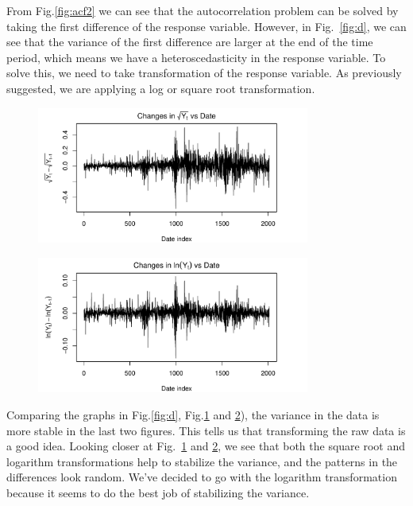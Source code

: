 \documentclass[conference,onecolumn,11pt]{IEEEtran}
\begin{document}
From Fig.\ref{fig:acf2} we can see that the autocorrelation problem can be solved by taking the first difference of the response variable. However, in Fig.~\ref{fig:d}, we can see that the variance of the first difference are larger at the end of the time period, which means we have a heteroscedasticity in the response variable. To solve this, we need to take transformation of the response variable. As previously suggested, we are applying a log or square root transformation.


\begin{figure}[htpb]
	\centering
	\includegraphics[width=0.8\textwidth]{pic/Sqrt_AdjClosed.pdf}
	\caption{}
	\label{fig:dsqrt}
\end{figure}

\begin{figure}[htpb]
	\centering
	\includegraphics[width=0.8\textwidth]{pic/log_AdjClosed.pdf}
	\caption{}
	\label{fig:dlog}
\end{figure}

Comparing the graphs in Fig.\ref{fig:d}, Fig.\ref{fig:dsqrt} and \ref{fig:dlog}), the variance in the data is more stable in the last two figures. This tells us that transforming the raw data is a good idea. Looking closer at Fig.~\ref{fig:dsqrt} and \ref{fig:dlog}, we see that both the square root and logarithm transformations help to stabilize the variance, and the patterns in the differences look random. We've decided to go with the logarithm transformation because it seems to do the best job of stabilizing the variance.
\end{document}
